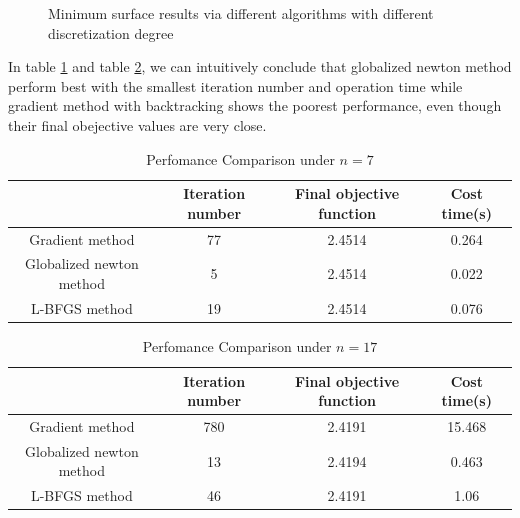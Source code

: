 \begin{figure}[!htbp]
{    }
    \caption{Minimum surface results via different algorithms with different discretization degree}
    \label{fig:alg_performance}  
\end{figure}
In table \ref{tab:per_n7} and table \ref{tab:per_n17}, we can intuitively conclude that globalized newton method perform best with the smallest iteration number and operation time while gradient method with backtracking shows the poorest performance, even though their final obejective values are very close.
\begin{table}[!ht]
    \caption{Perfomance Comparison under $n=7$}\label{tab:per_n7}
    \begin{tabular*}{\hsize}{@{}@{\extracolsep{\fill}}cccc@{}}
    \toprule
            &Iteration number  &Final objective function  &Cost time(s)  \\
    \midrule
    Gradient method   &77   &2.4514  &0.264  \\
    Globalized newton method   &5   &2.4514  &0.022  \\
    L-BFGS method   &19  &2.4514  &0.076  \\
    \bottomrule
    \end{tabular*}
\end{table}
\begin{table}[!ht]
    \caption{Perfomance Comparison under $n=17$}\label{tab:per_n17}
    \begin{tabular*}{\hsize}{@{}@{\extracolsep{\fill}}cccc@{}}
    \toprule
            &Iteration number  &Final objective function  &Cost time(s)  \\
    \midrule
    Gradient method   &780   &2.4191  &15.468  \\
    Globalized newton method   &13   &2.4194  &0.463  \\
    L-BFGS method   &46  &2.4191  &1.06  \\
    \bottomrule
    \end{tabular*}
\end{table}

